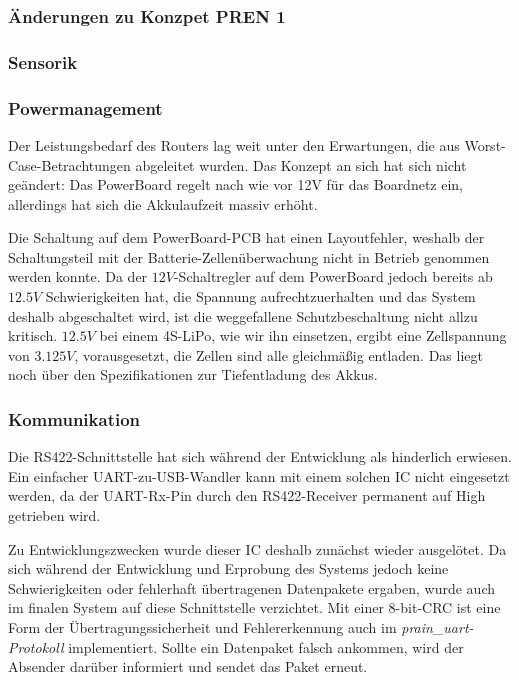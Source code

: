 \documentclass[main.tex]{subfiles} %
\begin{document}

\subsubsection{Änderungen zu Konzpet PREN 1}

\subsubsection*{Sensorik}

\subsubsection*{Powermanagement}

Der Leistungsbedarf des Routers lag weit unter den Erwartungen, die aus
Worst-Case-Betrachtungen abgeleitet wurden. Das Konzept an sich hat sich nicht
geändert: Das PowerBoard regelt nach wie vor 12V für das Boardnetz ein,
allerdings hat sich die Akkulaufzeit massiv erhöht.

Die Schaltung auf dem PowerBoard-PCB hat einen Layoutfehler, weshalb der
Schaltungsteil mit der Batterie-Zellenüberwachung nicht in Betrieb genommen
werden konnte. Da der $12V$-Schaltregler auf dem PowerBoard jedoch bereits ab
$12.5V$ Schwierigkeiten hat, die Spannung aufrechtzuerhalten und das System
deshalb abgeschaltet wird, ist die weggefallene Schutzbeschaltung nicht allzu
kritisch. $12.5V$ bei einem 4S-LiPo, wie wir ihn einsetzen, ergibt eine
Zellspannung von $3.125V$, vorausgesetzt, die Zellen sind alle gleichmäßig
entladen. Das liegt noch über den Spezifikationen zur Tiefentladung des Akkus.

\subsubsection*{Kommunikation}

Die RS422-Schnittstelle hat sich während der Entwicklung als hinderlich
erwiesen. Ein einfacher UART-zu-USB-Wandler kann mit einem solchen IC nicht
eingesetzt werden, da der UART-Rx-Pin durch den RS422-Receiver permanent auf
High getrieben wird.

Zu Entwicklungszwecken wurde dieser IC deshalb zunächst wieder ausgelötet. Da
sich während der Entwicklung und Erprobung des Systems jedoch keine
Schwierigkeiten oder fehlerhaft übertragenen Datenpakete ergaben, wurde auch im
finalen System auf diese Schnittstelle verzichtet. Mit einer 8-bit-CRC ist eine
Form der Übertragungssicherheit und Fehlererkennung auch im
\textit{prain\_uart-Protokoll} implementiert. Sollte ein Datenpaket falsch
ankommen, wird der Absender darüber informiert und sendet das Paket erneut.
\end{document}
